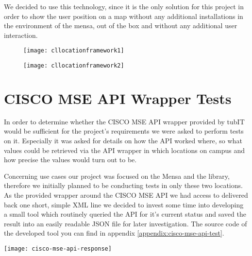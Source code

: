 We decided to use this technology, since it is the only solution for this project in order to show the user position on a map without any additional installations in the environment of the mensa, out of the box and without any additional user interaction.

\begin{figure}
\centering
\begin{minipage}{.5\textwidth}
  \centering
  \texttt{[image: cllocationframework1]}
  \label{fig:cllocationframework1}
\end{minipage}%
\begin{minipage}{.5\textwidth}
  \centering
  \texttt{[image: cllocationframework2]}
  \label{fig:cllocationframework2}
\end{minipage}
\end{figure}


\vspace{0.5cm}

\section{CISCO MSE API Wrapper Tests}

In order to determine whether the CISCO MSE API wrapper provided by tubIT would be sufficient for the project's requirements we were asked to perform tests on it. Especially it was asked for details on how the API worked where, so what values could be retrieved via the API wrapper in which locations on campus and how precise the values would turn out to be.

Concerning use cases our project was focused on the Mensa and the library, therefore we initially planned to be conducting tests in only these two locations. As the provided wrapper around the CISCO MSE API we had access to delivered back one short, simple XML line we decided to invest some time into developing a small tool which routinely queried the API for it's current status and saved the result into an easily readable JSON file for later investigation. The source code of the developed tool you can find in appendix \ref{appendix:cisco-mse-api-test}.

\begin{center}
    \texttt{[image: cisco-mse-api-response]}\\
\end{center}

